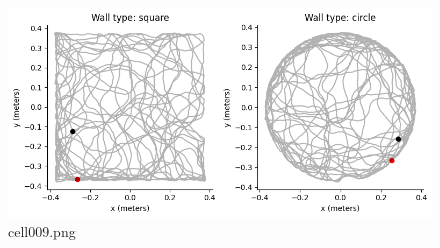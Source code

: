 \begin{figure}[ht]
	\centering
	\includegraphics[scale=0.8, max width=\linewidth]{./fig/motor-learning/rat-trajectory/cell009.png}
	\caption{cell009.png}
	\label{cell009.png}
\end{figure}